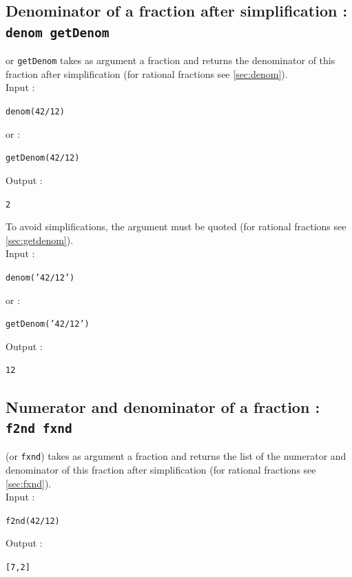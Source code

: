 \documentclass[a4paper,11pt]{book}
\begin{document}
\subsection{Denominator of a fraction after simplification : {\tt denom getDenom}}\label{sec:idenom}
 or {\tt getDenom} takes as argument a fraction and 
returns the denominator of this fraction  after simplification (for rational 
fractions see \ref{sec:denom}).\\
Input :
\begin{center}{\tt denom(42/12)}\end{center}
or :
\begin{center}{\tt getDenom(42/12)}\end{center}
Output :
\begin{center}{\tt 2}\end{center}
To avoid simplifications, the argument must
be quoted (for rational fractions see \ref{sec:getdenom}).\\
Input :
\begin{center}{\tt denom('42/12')}\end{center}
or :
\begin{center}{\tt getDenom('42/12')}\end{center}
Output :
\begin{center}{\tt 12}\end{center}

\subsection{Numerator and denominator of a fraction : {\tt f2nd fxnd}}\label{sec:ifxnd}
 (or {\tt fxnd}) takes as argument a fraction and returns 
the list of the numerator and denominator of this fraction after simplification
(for rational fractions see \ref{sec:fxnd}).\\
Input :
\begin{center}{\tt  f2nd(42/12)}\end{center}
Output :
\begin{center}{\tt [7,2]}\end{center}
\end{document}
